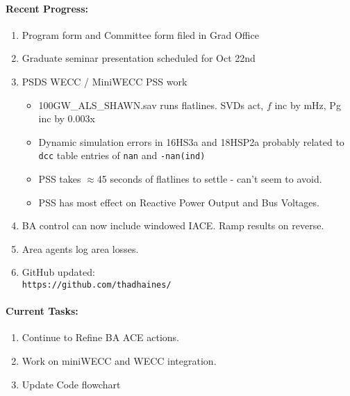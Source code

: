 \documentclass[12pt]{article}
\begin{document}
\begin{multicols}{2}
\raggedright
	\paragraph{Recent Progress:}
	\begin{enumerate}
		\item Program form and Committee form filed in Grad Office 
		\item Graduate seminar presentation scheduled for Oct 22nd
		\item PSDS WECC / MiniWECC PSS work
		\begin{itemize}
			\item 100GW\_ALS\_SHAWN.sav runs flatlines. SVDs act, $f$ inc by  mHz, Pg inc by 0.003x
			\item Dynamic simulation errors in 16HS3a and 18HSP2a probably related to \verb|dcc| table entries of \verb|nan| and \verb|-nan(ind)|
			\item PSS takes $\approx$45 seconds of flatlines to settle - can't seem to avoid.
			\item PSS has most effect on Reactive Power Output and Bus Voltages.
		\end{itemize}
		\item BA control can now include windowed IACE. Ramp results on reverse.
		\item Area agents log area losses.


		\item GitHub updated:\\
		\verb|https://github.com/thadhaines/|
		
	\end{enumerate}
\paragraph{Current Tasks:}
	\begin{enumerate}
		\item Continue to Refine BA ACE actions.

		\item Work on miniWECC and WECC integration.

		\item Update Code flowchart%
		

\end{enumerate}
\end{multicols}
\end{document}
